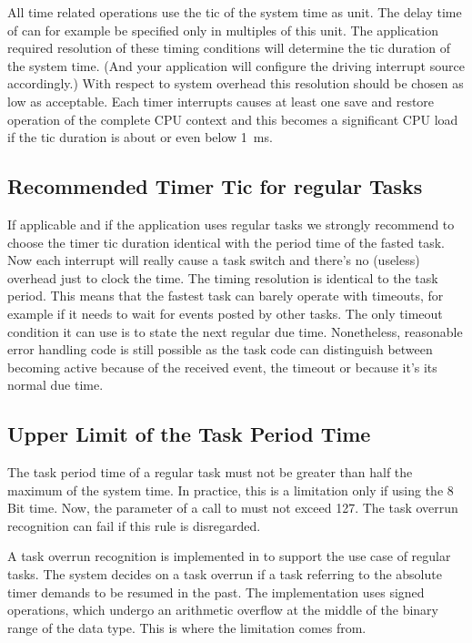 All time related operations use the tic of the system time as unit. The
delay time of  can for example be specified only in
multiples of this unit. The application required resolution of these
timing conditions will determine the tic duration of the system time. (And
your application will configure the driving interrupt source accordingly.)
With respect to system overhead this resolution should be chosen as low as
acceptable. Each timer interrupts causes at least one save and restore
operation of the complete CPU context and this becomes a significant CPU
load if the tic duration is about or even below 1~ms.


\subsection{Recommended Timer Tic for regular Tasks}

If applicable and if the application uses regular tasks we strongly
recommend to choose the timer tic duration identical with the period time
of the fasted task. Now each interrupt will really cause a task switch and
there's no (useless) overhead just to clock the time. The timing
resolution is identical to the task period. This means that the fastest
task can barely operate with timeouts, for example if it needs to wait for
events posted by other tasks. The only timeout condition it can use is to
state the next regular due time. Nonetheless, reasonable error handling
code is still possible as the task code can distinguish between becoming
active because of the received event, the timeout or because it's its
normal due time.


\subsection{Upper Limit of the Task Period Time}

The task period time of a regular task must not be greater than half the
maximum of the system time. In practice, this is a limitation only if
using the 8 Bit time. Now, the parameter of a call to
 must not exceed 127. The task overrun
recognition can fail if this rule is disregarded.

A task overrun recognition is implemented in \rtos{} to support the use case
of regular tasks. The system decides on a task overrun if a task referring
to the absolute timer demands to be resumed in the past. The
implementation uses signed operations, which undergo an arithmetic
overflow at the middle of the binary range of the data type. This is where
the limitation comes from.

